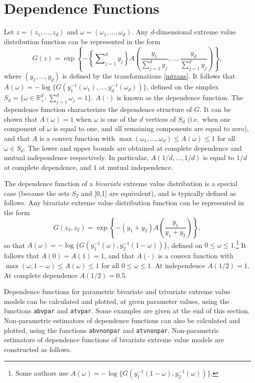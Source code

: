 \documentclass[11pt,a4paper]{article}
\begin{document}
\section{Dependence Functions}
\setcounter{footnote}{0}
\label{depfun}

Let $z=(z_1,\dots,z_d)$ and $\omega=(\omega_1,\dots,\omega_d)$. Any $d$-dimensional extreme value distribution function can be represented in the form
\begin{equation}
G(z) = \exp\left\{ - \left\{\sum\nolimits_{j=1}^d y_j \right\} A\left(\frac{y_1}{\sum\nolimits_{j=1}^d y_j}, \dots, \frac{y_d}{\sum\nolimits_{j=1}^d y_j} \right)\right\},
\label{mvdepfn}
\end{equation}
where $(y_1,\dots,y_d)$ is defined by the transformations \eqref{mtrans}. It follows that $A(\omega)=-\log\{G(y_1^{-1}(\omega_1),\dots,y_d^{-1}(\omega_d))\}$, defined on the simplex $S_d =\{\omega \in \mathbb{R}^d_+: \sum_{j=1}^d \omega_j = 1\}$. 
$A(\cdot)$ is known as the dependence function. The dependence function characterizes the dependence structure of $G$.
It can be shown that $A(\omega)=1$ when $\omega$ is one of the $d$ vertices of $S_d$ (i.e.\ when one component of $\omega$ is equal to one, and all remaining components are equal to zero), and that $A$ is a convex function with $\max(\omega_1,\dots,\omega_d) \leq A(\omega) \leq 1$ for all $\omega \in S_d$.
The lower and upper bounds are obtained at complete dependence and mutual independence respectively. 
In particular, $A(1/d,\dots,1/d)$ is equal to $1/d$ at complete dependence, and $1$ at mutual independence.  

The dependence function of a \emph{bivariate} extreme value distribution is a special case (because the sets $S_2$ and [0,1] are equivalent), and is typically defined as follows.
Any bivariate extreme value distribution function can be represented in the form
\begin{equation}
G(z_1,z_2) = \exp\left\{ - (y_1 + y_2)A\left(\frac{y_1}{y_1+y_2}\right)\right\},
\label{bvdepfn}
\end{equation}
so that $A(\omega)=-\log\{G(y_1^{-1}(\omega),y_2^{-1}(1-\omega))\}$, defined on
$0\leq\omega\leq1$.\footnote{Some authors \citep[e.g.][]{pick81} use $A(\omega)=-\log\{G(y_1^{-1}(1-\omega),y_2^{-1}(\omega))\}$.}
It follows that $A(0)=A(1)=1$, and that $A(\cdot)$ is a convex function with $\max(\omega,1-\omega) \leq A(\omega) \leq 1$ for all $0\leq\omega\leq1$. 
At independence $A(1/2) = 1$.
At complete dependence $A(1/2) = 0.5$. 

Dependence functions for parametric bivariate and trivariate extreme value models can be calculated and plotted, at given parameter values, using the functions \verb+abvpar+ and \verb+atvpar+. Some examples are given at the end of this section.
Non-parametric estimators of dependence functions can also be calculated and plotted, using the functions \verb+abvnonpar+ and \verb+atvnonpar+.
Non-parametric estimators of dependence functions of bivariate extreme value models are constructed as follows.
\end{document}
